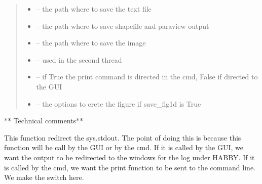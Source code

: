 \documentclass[letterpaper,10pt,english]{sphinxmanual}
\begin{document}
\begin{fulllineitems}
\begin{quote}
\begin{description}
\begin{itemize}
\item {} 
 -- the path where to save the text file

\item {} 
 -- the path where to save shapefile and paraview output

\item {} 
 -- the path where to save the image

\item {} 
 -- used in the second thread

\item {} 
 -- if True the print command is directed in the cmd, False if directed to the GUI

\item {} 
 -- the options to crete the figure if save\_fig1d is True

\end{itemize}

\end{description}\end{quote}

** Technical comments**

This function redirect the sys.stdout. The point of doing this is because this function will be call by the GUI or
by the cmd. If it is called by the GUI, we want the output to be redirected to the windows for the log under HABBY.
If it is called by the cmd, we want the print function to be sent to the command line. We make the switch here.

\end{fulllineitems}

\end{document}
